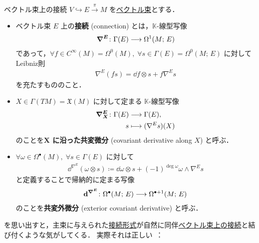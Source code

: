 \documentclass[TQFT_main]{subfiles}
\begin{document}
\begin{mydef}[label=def:connection-vect]{ベクトル束上の接続}
    $V \hookrightarrow  E \xrightarrow{\pi} M$ を\hyperref[def:vect]{ベクトル束}とする．
    \begin{itemize}
        \item ベクトル束 $E$ 上の\textbf{接続} (connection) とは，$\mathbb{K}$-線型写像
        \begin{align}
            \bm{\nabla^E} \colon \Gamma(E) \longrightarrow \Omega^1(M;\, E)
        \end{align}
        であって，$\forall f \in C^\infty (M) = \Omega^0 (M),\; \forall s \in \Gamma(E) = \Omega^0 (M;\, E)$ に対してLeibniz則
        \begin{align}
            \nabla^E (fs) = \dd{f} \otimes s + f \nabla^E s
        \end{align}
        を充たすもののこと．
        \item $X \in \Gamma (TM) = \mathfrak{X}(M)$ に対して定まる $\mathbb{K}$-線型写像
        \begin{align}
            \bm{\nabla^E_X} \colon \Gamma(E) &\longrightarrow \Gamma(E), \\
            s &\longmapsto (\nabla^E s)(X)
        \end{align}
        のことを\textbf{$\bm{X}$ に沿った共変微分} (covariant derivative along $X$) と呼ぶ．
        \item $\forall \omega \in \Omega^\bullet(M),\; \forall s \in \Gamma(E)$ に対して
        \begin{align}
            \dd^{\nabla^E}(\omega \otimes s) \coloneqq \dd{\omega} \otimes s + (-1)^{\deg \omega} \omega \wedge \nabla^E s
        \end{align}
        と定義することで帰納的に定まる写像
        \begin{align}
            \bm{\mathrm{d}^{\nabla^E}} \colon \Omega^\bullet (M;\, E) \longrightarrow \Omega^{\bullet+1} (M;\, E)
        \end{align}
        のことを\textbf{共変外微分} (exterior covariant derivative) と呼ぶ．
    \end{itemize}
\end{mydef}

を思い出すと，主束に与えられた\hyperref[def:connection]{接続形式}が自然に同伴\hyperref[def:connection-vect]{ベクトル束上の接続}と結び付くような気がしてくる．
実際それは正しい~\cite[p.150, 命題6.3.3]{Imai2013diff}：
\end{document}

